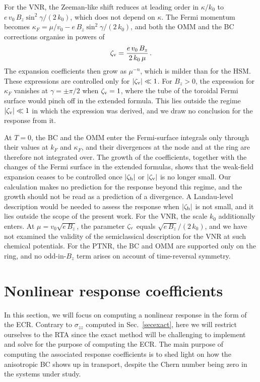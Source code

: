 \documentclass[aps,prb,onecolumn,nofootinbib,citeautoscript,10pt]{revtex4-2}
\begin{document}
For the VNR, the Zeeman-like shift reduces at leading order in $\kappa/k_0$ to $e\,v_0\,B_z\sin^2\gamma/(2\,k_0)$, which does not depend on $\kappa$. The Fermi momentum becomes $\kappa_F=\mu/v_0-e\,B_z\sin^2\gamma/(2\,k_0)$, and both the OMM and the BC corrections organise in powers of
\begin{align}
\zeta_{\rm v}=\frac{e\,v_0\,B_z}{2\,k_0\,\mu}\,.
\end{align}
The expansion coefficients then grow as $\mu^{-n}$, which is milder than for the HSM. These expressions are controlled only for $|\zeta_{\rm v}|\ll1$. For $B_z>0$, the expression for $\kappa_F$ vanishes at $\gamma=\pm\pi/2$ when $\zeta_{\rm v}=1$, where the tube of the toroidal Fermi surface would pinch off in the extended formula. This lies outside the regime $|\zeta_{\rm v}|\ll1$ in which the expression was derived, and we draw no conclusion for the response from it.

At $T=0$, the BC and the OMM enter the Fermi-surface integrals only through their values at $k_F$ and $\kappa_F$, and their divergences at the node and at the ring are therefore not integrated over. The growth of the coefficients, together with the changes of the Fermi surface in the extended formulas, shows that the weak-field expansion ceases to be controlled once $|\zeta_{\rm h}|$ or $|\zeta_{\rm v}|$ is no longer small. Our calculation makes no prediction for the response beyond this regime, and the growth should not be read as a prediction of a divergence. A Landau-level description would be needed to assess the response when $|\zeta_{\rm h}|$ is not small, and it lies outside the scope of the present work. For the VNR, the scale $k_0$ additionally enters. At $\mu=v_0\sqrt{e\,B_z}$, the parameter $\zeta_{\rm v}$ equals $\sqrt{e\,B_z}/(2\,k_0)$, and we have not examined the validity of the semiclassical description for the VNR at such chemical potentials. For the PTNR, the BC and OMM are supported only on the ring, and no odd-in-$B_z$ term arises on account of time-reversal symmetry.


\section{Nonlinear response coefficients}
\label{secnonlinear}



In this section, we will focus on computing a nonlinear response in the form of the ECR. Contrary to $\sigma_{zz}$ computed in Sec.~\ref{secexact}, here we will restrict ourselves to the RTA since the exact method will be challenging to implement and solve for the purpose of computing the ECR. The main purpose of computing the associated response coefficients is to shed light on how the anisotropic BC shows up in transport, despite the Chern number being zero in the systems under study.
\end{document}
